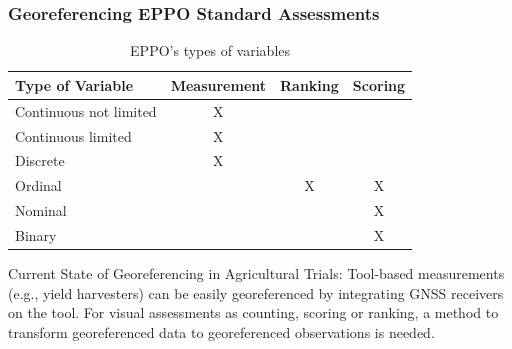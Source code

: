 \documentclass[aspectratio=43]{beamer}
\begin{document}
\begin{frame}
    \frametitle{Georeferencing EPPO Standard Assessments}
    
    \begin{table}[ht]
        \caption{\small EPPO's types of variables}
        \label{tab:data_types_slide}
        \centering
        \begin{tabular}{|l|c|c|c|}
        \hline
        \textbf{Type of Variable} & \textbf{Measurement} & \textbf{Ranking} & \textbf{Scoring} \\
        \hline
        \rowcolor{green!20} Continuous not limited & X & & \\
        \hline
        \rowcolor{green!20} Continuous limited & X & & \\
        \hline
        \rowcolor{yellow!20} Discrete & X & & \\
        \hline
        \rowcolor{red!20} Ordinal & & X & X \\
        \hline
        \rowcolor{red!20} Nominal & & & X \\
        \hline
        \rowcolor{red!20} Binary & & & X \\
        \hline
        \end{tabular}
        \end{table}
        
    \begin{flushleft}
        \hspace{1.5cm}{\tiny Summary from EPPO PP 1/152: Design and analysis of efficacy evaluation trials}
    \end{flushleft}

    \begin{block}{Current State of Georeferencing in Agricultural Trials:}
        \small Tool-based measurements (e.g., yield harvesters) can be easily georeferenced by integrating GNSS receivers on the tool. For visual assessments as counting, scoring or ranking, a method to transform georeferenced data to georeferenced observations is needed.
    \end{block}
\end{frame}
\end{document}
